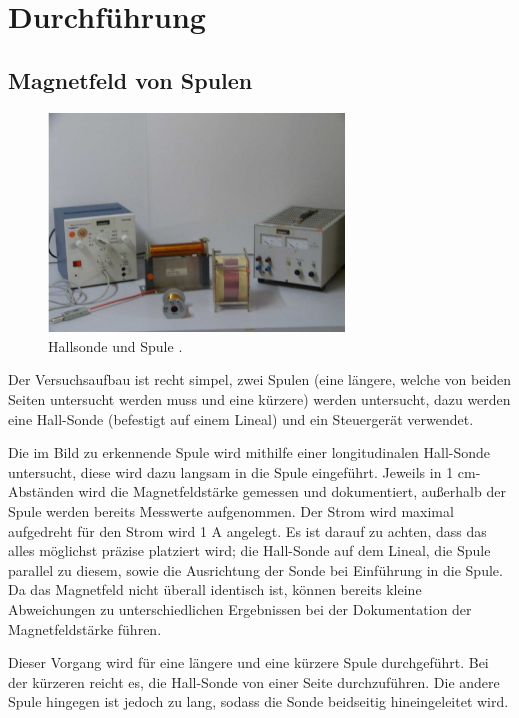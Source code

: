 \section{Durchführung}
\label{sec:Durchführung}

\subsection{Magnetfeld von Spulen}
\begin{figure}
    \caption{Hallsonde und Spule \cite{anleitung1}.}
    \centering
    \includegraphics[width=0.7\textwidth]{"Bilder/mvs.jpg"}
\end{figure}
\noindent Der Versuchsaufbau ist recht simpel, zwei Spulen (eine längere, welche
von beiden Seiten untersucht werden muss und eine kürzere) werden untersucht,
dazu werden eine Hall-Sonde (befestigt auf einem Lineal) und ein Steuergerät
verwendet.

Die im Bild zu erkennende Spule wird mithilfe einer longitudinalen Hall-Sonde 
untersucht, diese wird dazu langsam in die Spule eingeführt. Jeweils in 1 cm-
Abständen wird die Magnetfeldstärke gemessen und dokumentiert, außerhalb der 
Spule werden bereits Messwerte aufgenommen. Der Strom wird maximal aufgedreht 
für den Strom wird 1 A angelegt. Es ist darauf 
zu achten, dass das alles möglichst präzise platziert wird; die Hall-Sonde auf 
dem Lineal, die Spule parallel zu diesem, sowie die Ausrichtung der Sonde bei 
Einführung in die Spule. Da das Magnetfeld nicht überall identisch ist, können 
bereits kleine Abweichungen zu unterschiedlichen Ergebnissen bei der Dokumentation 
der Magnetfeldstärke führen. 

Dieser Vorgang wird für eine längere und eine kürzere Spule durchgeführt. Bei 
der kürzeren reicht es, die Hall-Sonde von einer Seite durchzuführen. Die andere 
Spule hingegen ist jedoch zu lang, sodass die Sonde beidseitig hineingeleitet 
wird.

